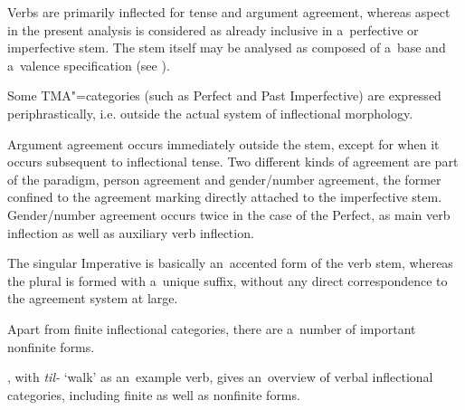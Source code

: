Verbs are primarily inflected for tense and argument agreement, whereas aspect in the present analysis is considered as already inclusive in a~perfective or imperfective stem. The stem itself may be analysed as composed of a~base and a~valence specification (see ). 


Some TMA"=categories (such as Perfect and Past Imperfective) are expressed periphrastically, i.e. outside the actual system of inflectional morphology. 


Argument agreement occurs immediately outside the stem, except for when it occurs subsequent to inflectional tense. Two different kinds of agreement are part of the paradigm, person agreement and gender/number agreement, the former confined to the agreement marking directly attached to the imperfective stem. Gender/number agreement occurs twice in the case of the Perfect, as main verb inflection as well as auxiliary verb inflection. 


The singular Imperative is basically an~accented form of the verb stem, whereas the plural is formed with a~unique suffix, without any direct correspondence to the agreement system at large.


Apart from finite inflectional categories, there are a~number of important nonfinite forms.


, with \textit{til-} `walk' as an~example verb, gives an~overview of verbal inflectional categories, including finite as well as nonfinite forms.


